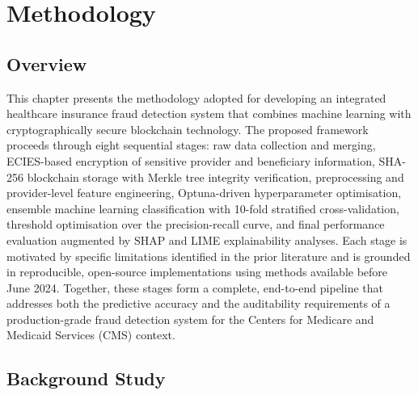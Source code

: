 \chapter{Methodology}

\section{Overview}

This chapter presents the methodology adopted for developing an
integrated healthcare insurance fraud detection system that combines machine
learning with cryptographically secure blockchain technology. The
proposed framework proceeds through eight sequential stages: raw data collection
and merging, ECIES-based encryption of sensitive provider and beneficiary
information, SHA-256 blockchain storage with Merkle tree integrity verification,
preprocessing and provider-level feature engineering, Optuna-driven
hyperparameter optimisation, ensemble machine learning classification with
10-fold stratified cross-validation, threshold optimisation over the
precision-recall curve, and final performance evaluation augmented by SHAP and
LIME explainability analyses. Each stage is motivated by specific limitations
identified in the prior literature and is grounded in reproducible, open-source
implementations using methods available before June 2024. Together, these stages
form a complete, end-to-end pipeline that addresses both the predictive accuracy
and the auditability requirements of a production-grade fraud detection system
for the Centers for Medicare and Medicaid Services (CMS) context.

\section{Background Study}

